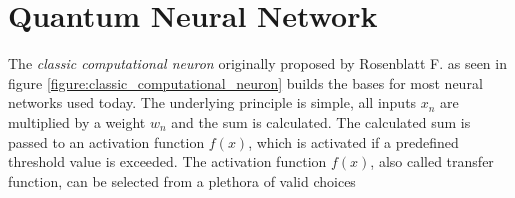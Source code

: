 
\newpage

\section{Quantum Neural Network}

The \textit{classic computational neuron} originally proposed by Rosenblatt F.\cite{rosenblatt_perceptron_1958} as seen in figure \ref{figure:classic_computational_neuron} builds the bases for most neural networks used today. The underlying principle is simple, all inputs $x_n$ are multiplied by a weight $w_n$ and the sum is calculated. The calculated sum is passed to an activation function $f(x)$, which is activated if a predefined threshold value is exceeded. The activation function $f(x)$, also called transfer function, can be selected from a plethora of valid choices\cite{szandala_review_2021}

